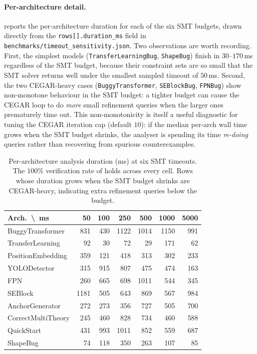 \documentclass{article}
\theoremstyle{plain}
\theoremstyle{definition}
\newcommand{\code}[1]{\texttt{\small #1}}
\begin{document}
\paragraph{Per-architecture detail.}
 reports the per-architecture
duration for each of the six SMT budgets, drawn directly from the
\code{rows[].duration\_ms} field in
\code{benchmarks/timeout\_sensitivity.json}.  Two observations are
worth recording.  First, the simplest models
(\code{TransferLearningBug}, \code{ShapeBug}) finish in
$30$--$170$\,ms regardless of the SMT budget, because their
constraint sets are so small that the SMT solver returns well
under the smallest sampled timeout of $50$\,ms.  Second, the
two CEGAR-heavy cases (\code{BuggyTransformer},
\code{SEBlockBug}, \code{FPNBug}) show non-monotone behaviour in
the SMT budget: a tighter budget can cause the CEGAR loop to do
\emph{more} small refinement queries when the larger ones
prematurely time out.  This non-monotonicity is itself a
useful diagnostic for tuning the CEGAR iteration cap (default
$10$): if the median per-arch wall time grows when the SMT
budget shrinks, the analyser is spending its time
\emph{re-doing} queries rather than recovering from spurious
counterexamples.

\begin{table}[t]
\centering\scriptsize
\caption{Per-architecture analysis duration (ms) at six SMT
timeouts.  The $100\%$ verification rate of 
holds across every cell.  Rows whose duration grows when the SMT
budget shrinks are CEGAR-heavy, indicating extra refinement
queries below the budget.}
\label{tab:timesens-per-arch}
\setlength\tabcolsep{3pt}
\begin{tabular}{lrrrrrr}
\toprule
Arch.\ \textbackslash\ ms & 50 & 100 & 250 & 500 & 1000 & 5000 \\
\midrule
BuggyTransformer    &  831 &  430 & 1122 & 1014 & 1150 &  991 \\
TransferLearning    &   92 &   30 &   72 &   29 &  171 &   62 \\
PositionEmbedding   &  359 &  121 &  418 &  313 &  302 &  233 \\
YOLODetector        &  315 &  915 &  807 &  475 &  474 &  163 \\
FPN                 &  260 &  665 &  698 & 1011 &  544 &  345 \\
SEBlock             & 1181 &  505 &  643 &  869 &  567 &  984 \\
AnchorGenerator     &  272 &  273 &  356 &  727 &  505 &  700 \\
CorrectMultiTheory  &  245 &  460 &  828 &  734 &  460 &  588 \\
QuickStart          &  431 &  993 & 1011 &  852 &  559 &  687 \\
ShapeBug            &   74 &  118 &  350 &  263 &  107 &   85 \\
\bottomrule
\end{tabular}
\end{table}
\end{document}
